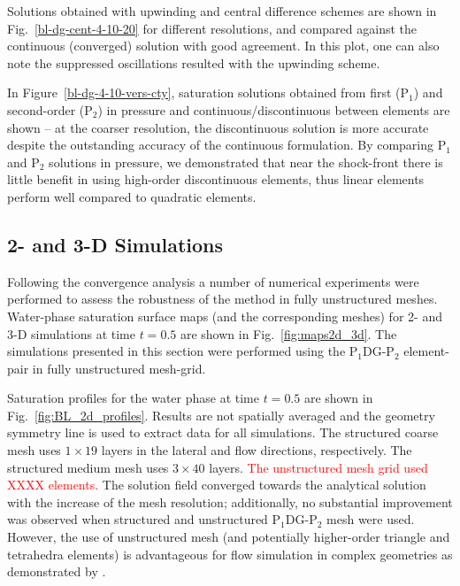 \documentclass[preprint,authoryear,12pt]{elsarticle}
\newcommand{\PN}[2][error]{P$_{#1}$DG-P$_{#2}$}
\begin{document}
Solutions obtained with upwinding and central difference schemes are shown in Fig.~\ref{bl-dg-cent-4-10-20} for different resolutions, and compared against the continuous (converged) solution with good agreement. In this plot, one can also note the suppressed oscillations resulted with the upwinding scheme. 

In Figure~\ref{bl-dg-4-10-vers-cty}, saturation solutions obtained from first (P$_{1}$) and second-order (P$_{2}$) in pressure and continuous/discontinuous between elements are shown -- at the coarser resolution, the discontinuous solution is more accurate despite the outstanding accuracy of the continuous formulation. By comparing P$_{1}$ and P$_{2}$ solutions in pressure, we demonstrated that near the shock-front there is little benefit in using high-order discontinuous elements, thus linear elements perform well compared to quadratic elements. 

\subsection{2- and 3-D Simulations}
Following the convergence analysis a number of numerical experiments were performed to assess the robustness of the method in fully unstructured meshes. Water-phase saturation surface maps (and the corresponding meshes) for 2- and 3-D simulations at time $t=0.5$ are shown in Fig.~\ref{fig:maps2d_3d}. The simulations presented in this section were performed using the \PN[1]{2} element-pair in fully unstructured mesh-grid.

Saturation profiles for the water phase at time $t=0.5$ are shown in Fig.~\ref{fig:BL_2d_profiles}. Results are not spatially averaged and the geometry symmetry line is used to extract data for all simulations. The structured coarse mesh uses $1 \times 19$ layers in the lateral and flow directions, respectively. The structured medium mesh uses $3 \times 40$ layers. \textcolor{red}{The unstructured mesh grid used XXXX elements.}  The solution field converged towards the analytical solution with the increase of the mesh resolution; additionally, no substantial improvement was observed when structured and unstructured \PN[1]{2} mesh were used. However, the use of unstructured mesh (and potentially higher-order triangle and tetrahedra elements) is advantageous for flow simulation in complex geometries as demonstrated by \cite{jackson_2013}.
\end{document}
